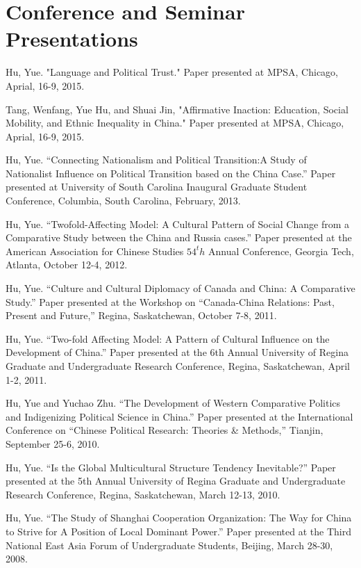 \documentclass[letterpaper]{article}
\renewenvironment{itemize}{
  \begin{list}{}{
    \setlength{\leftmargin}{1.5em}
  }
}{
  \end{list}
}
\begin{document}
\section*{Conference and Seminar Presentations}
\begin{itemize}
\item Hu, Yue. "Language and Political Trust." Paper presented at MPSA, Chicago, Aprial, 16-9, 2015.
\item Tang, Wenfang, Yue Hu, and Shuai Jin, "Affirmative Inaction: Education, Social Mobility, and Ethnic Inequality in China." Paper presented at MPSA, Chicago, Aprial, 16-9, 2015.
\item Hu, Yue. ``Connecting Nationalism and Political Transition:A Study of Nationalist Influence on Political Transition based on the China Case.'' Paper presented at University of South Carolina Inaugural Graduate Student Conference, Columbia, South Carolina, February, 2013. 
\item Hu, Yue. ``Twofold-Affecting Model: A Cultural Pattern of Social Change from a Comparative Study between the China and Russia cases.'' Paper presented at the American Association for Chinese Studies $54^th$ Annual Conference, Georgia Tech, Atlanta, October 12-4, 2012.
\item Hu, Yue. ``Culture and Cultural Diplomacy of Canada and China: A Comparative Study.'' Paper presented at the Workshop on ``Canada-China Relations: Past, Present and Future,'' Regina, Saskatchewan, October 7-8, 2011.
\item Hu, Yue. ``Two-fold Affecting Model: A Pattern of Cultural Influence on the Development of China.'' Paper presented at the 6th Annual University of Regina Graduate and Undergraduate Research Conference, Regina, Saskatchewan, April 1-2, 2011.
\item Hu, Yue and Yuchao Zhu. ``The Development of Western Comparative Politics and Indigenizing Political Science in China.'' Paper presented at the International Conference on ``Chinese Political Research: Theories \& Methods,'' Tianjin, September 25-6, 2010.
\item Hu, Yue. ``Is the Global Multicultural Structure Tendency Inevitable?'' Paper presented at the 5th Annual University of Regina Graduate and Undergraduate Research Conference, Regina, Saskatchewan, March 12-13, 2010.
\item Hu, Yue. ``The Study of Shanghai Cooperation Organization: The Way for China to Strive for A Position of Local Dominant Power.'' Paper presented at the Third National East Asia Forum of Undergraduate Students, Beijing, March 28-30, 2008.
\end{itemize}
\end{document}
